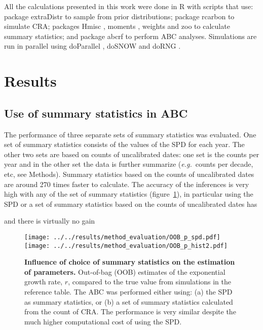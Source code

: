 \documentclass[a4paper]{article}
\begin{document}
All the calculations presented in this work were done in R \parencite{R2021} with scripts \parencite[available in][]{Navascues2023} that use: package {extraDistr} \parencite{Wolodzko2020} to sample from prior distributions; package {rcarbon} \parencite{Crema2021a} to simulate CRA; packages {Hmisc} \parencite{Harrell2022}, {moments} \parencite{Komsta2022}, {weights} \parencite{Pasek2021} and {zoo} \parencite{Zeileis2005} to calculate summary statistics; and package {abcrf} \parencite{Marin2022} to perform ABC analyses. Simulations are run in parallel using  {doParallel} \parencite{Microsoft2022a}, {doSNOW} \parencite{Microsoft2022b} and {doRNG} \parencite{Gaujoux2023}.
\\


\section*{\centering Results}

\subsection*{Use of summary statistics in ABC}

The performance of three separate sets of summary statistics was evaluated. One set of summary statistics consists of the values of the SPD for each year. The other two sets are based on counts of uncalibrated dates: one set is the counts per year and in the other set the data is further summarize (\emph{e.g.}\ counts per decade, etc, see Methods). Summary statistics based on the counts of uncalibrated dates are around 270 times faster to calculate. The accuracy of the inferences is very high with any of the set of summary statistics (figure~\ref{fig:summary_stats}), in particular using the SPD or a set of summary statistics based on the counts of uncalibrated dates has

and there is virtually no gain


\begin{figure}[tbh]
\center\texttt{[image: ../../results/method\_evaluation/OOB\_p\_spd.pdf]} \texttt{[image: ../../results/method\_evaluation/OOB\_p\_hist2.pdf]}
\caption{\textbf{Influence of choice of summary statistics on the estimation of parameters.} Out-of-bag (OOB) estimates of the exponential growth rate, $r$, compared to the true value from simulations in the reference table. The ABC was performed either using: (a) the SPD as summary statistics, or (b) a set of summary statistics calculated from the count of CRA. The performance is very similar despite the much higher computational cost of using the SPD.}
\label{fig:summary_stats}
\end{figure}
\end{document}
